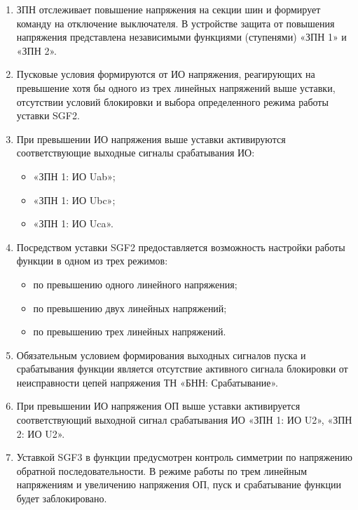 
\color{black}

\begin{enumerate}

\item
ЗПН отслеживает повышение напряжения на секции шин и формирует команду на отключение выключателя. В устройстве защита от повышения напряжения представлена независимыми функциями (ступенями) «ЗПН 1» и «ЗПН 2».

\item
Пусковые условия формируются от ИО напряжения, реагирующих на превышение хотя бы одного из трех линейных напряжений выше уставки, отсутствии условий блокировки и выбора определенного режима работы уставки SGF2.

\item
При превышении ИО напряжения выше уставки активируются соответствующие выходные сигналы срабатывания ИО:
\begin{itemize}
    \item «ЗПН 1: ИО Uab»;
    \item «ЗПН 1: ИО Ubc»;
    \item «ЗПН 1: ИО Uca».
\end{itemize}

\item
Посредством уставки SGF2 предоставляется возможность настройки работы функции в одном из трех режимов:
\begin{itemize}
    \item по превышению одного линейного напряжения;
    \item по превышению двух линейных напряжений;
    \item по превышению трех линейных напряжений.
\end{itemize}

\item
Обязательным условием формирования выходных сигналов пуска и срабатывания функции является отсутствие активного сигнала блокировки от неисправности цепей напряжения ТН «БНН: Срабатывание».

\item
При превышении ИО напряжения ОП выше уставки активируется соответствующий выходной сигнал срабатывания ИО «ЗПН 1: ИО U2», «ЗПН 2: ИО U2».

\item
Уставкой SGF3 в функции предусмотрен контроль симметрии по напряжению обратной последовательности. В режиме работы по трем линейным напряжениям и увеличению напряжения ОП, пуск и срабатывание функции будет заблокировано.


\end{enumerate}

